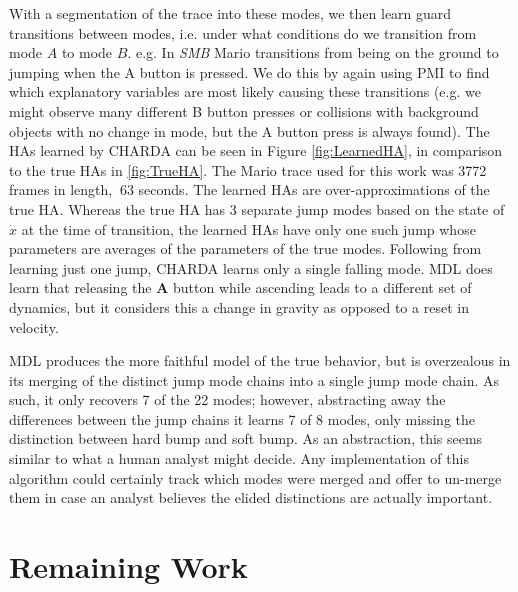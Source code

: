 \documentclass[12pt]{report}
\begin{document}
With a segmentation of the trace into these modes, we then learn guard transitions between modes, i.e. under what conditions do we transition from mode $A$ to mode $B$. e.g. In \textit{SMB} Mario transitions from being on the ground to jumping when the A button is pressed. We do this by again using PMI to find which explanatory variables are most likely causing these transitions (e.g. we might observe many different B button presses or collisions with background objects with no change in mode, but the A button press is always found). The HAs learned by CHARDA can be seen in Figure \ref{fig:LearnedHA}, in comparison to the true HAs in \ref{fig:TrueHA}.  The Mario trace used for this work was 3772 frames in length, $~63$ seconds.  The learned HAs are over-approximations of the true HA.  Whereas the true HA has 3 separate jump modes based on the state of $\dot{x}$ at the time of transition, the learned HAs have only one such jump whose parameters are averages of the parameters of the true modes.  Following from learning just one jump, CHARDA learns only a single falling mode.  MDL does learn that releasing the \textbf{A} button while ascending leads to a different set of dynamics, but it considers this a change in gravity as opposed to a reset in velocity.

MDL produces the more faithful model of the true behavior, but is overzealous in its merging of the distinct jump mode chains into a single jump mode chain. As such, it only recovers 7 of the 22 modes; however, abstracting away the differences between the jump chains it learns 7 of 8 modes, only missing the distinction between hard bump and soft bump. 
As an abstraction, this seems similar to what a human analyst might decide.
Any implementation of this algorithm could certainly track which modes were merged and offer to un-merge them in case an analyst believes the elided distinctions are actually important.
\section*{Remaining Work}
\end{document}
